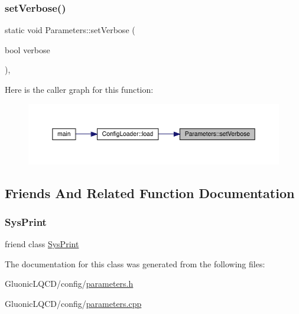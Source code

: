 \subsubsection{\texorpdfstring{setVerbose()}{setVerbose()}}
{\footnotesize\ttfamily static void Parameters\+::set\+Verbose (\begin{DoxyParamCaption}\item[{bool}]{verbose }\end{DoxyParamCaption})\hspace{0.3cm}{\ttfamily [inline]}, {\ttfamily [static]}}

Here is the caller graph for this function\+:
\nopagebreak
\begin{figure}[H]
\begin{center}
\leavevmode
\includegraphics[width=350pt]{class_parameters_aa0ac9d09db506844758e0a5d23dedeb4_icgraph}
\end{center}
\end{figure}


\subsection{Friends And Related Function Documentation}
\mbox{\label{class_parameters_aa0fdc1e103aea3a32f97ca2009dda3e6}} 
\subsubsection{\texorpdfstring{SysPrint}{SysPrint}}
{\footnotesize\ttfamily friend class \mbox{\hyperlink{class_sys_print}{Sys\+Print}}\hspace{0.3cm}{\ttfamily [friend]}}



The documentation for this class was generated from the following files\+:\begin{DoxyCompactItemize}
\item 
Gluonic\+L\+Q\+C\+D/config/\mbox{\hyperlink{parameters_8h}{parameters.\+h}}\item 
Gluonic\+L\+Q\+C\+D/config/\mbox{\hyperlink{parameters_8cpp}{parameters.\+cpp}}\end{DoxyCompactItemize}
